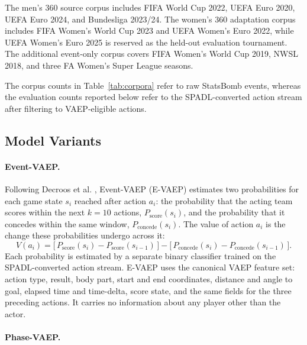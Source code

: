 \documentclass[runningheads]{llncs}
\begin{document}
The men's 360 source corpus includes FIFA World Cup 2022, UEFA Euro 2020, UEFA Euro 2024, and Bundesliga 2023/24. The women's 360 adaptation corpus includes FIFA Women's World Cup 2023 and UEFA Women's Euro 2022, while UEFA Women's Euro 2025 is reserved as the held-out evaluation tournament. The additional event-only corpus covers FIFA Women's World Cup 2019, NWSL 2018, and three FA Women's Super League seasons.

The corpus counts in Table~\ref{tab:corpora} refer to raw StatsBomb events, whereas the evaluation counts reported below refer to the SPADL-converted action stream after filtering to VAEP-eligible actions.

\subsection{Model Variants}

\paragraph{\textbf{Event-VAEP.}}
Following Decroos et al. \cite{decroos2019actions}, Event-VAEP (E-VAEP) estimates two probabilities for each game state $s_i$ reached after action $a_i$: the probability that the acting team scores within the next $k = 10$ actions, $P_{\text{score}}(s_i)$, and the probability that it concedes within the same window, $P_{\text{concede}}(s_i)$. The value of action $a_i$ is the change these probabilities undergo across it:
\[
V(a_i) = \big[\, P_{\text{score}}(s_i) - P_{\text{score}}(s_{i-1}) \,\big] - \big[\, P_{\text{concede}}(s_i) - P_{\text{concede}}(s_{i-1}) \,\big].
\]
Each probability is estimated by a separate binary classifier trained on the SPADL-converted action stream. E-VAEP uses the canonical VAEP feature set: action type, result, body part, start and end coordinates, distance and angle to goal, elapsed time and time-delta, score state, and the same fields for the three preceding actions. It carries no information about any player other than the actor.

\paragraph{\textbf{Phase-VAEP.}}
\end{document}
